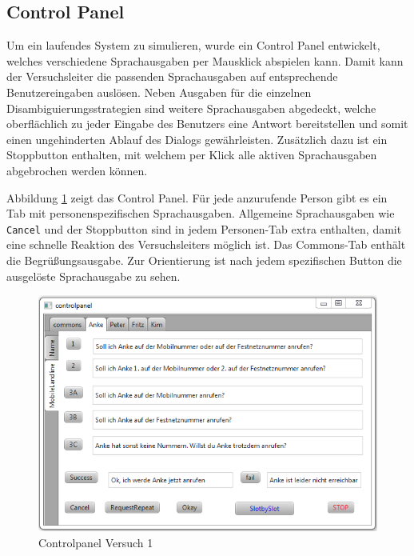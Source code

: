 \documentclass[12pt,a4paper]{scrartcl}
\begin{document}
\subsection{Control Panel}
\label{ControlPanel}
Um ein laufendes System zu simulieren, wurde ein Control Panel entwickelt, welches verschiedene Sprachausgaben per Mausklick abspielen kann. Damit kann der Versuchsleiter die passenden Sprachausgaben auf entsprechende Benutzereingaben auslösen. Neben Ausgaben für die einzelnen Disambiguierungsstrategien sind weitere Sprachausgaben abgedeckt, welche oberflächlich zu jeder Eingabe des Benutzers eine Antwort bereitstellen und somit einen ungehinderten Ablauf des Dialogs gewährleisten. Zusätzlich dazu ist ein Stoppbutton enthalten, mit welchem per Klick alle aktiven Sprachausgaben abgebrochen werden können. 

Abbildung \ref{cp1} zeigt das Control Panel. Für jede anzurufende Person gibt es ein Tab mit personenspezifischen Sprachausgaben. Allgemeine Sprachausgaben wie \texttt{Cancel} und der Stoppbutton sind in jedem Personen-Tab extra enthalten, damit eine schnelle Reaktion des Versuchsleiters möglich ist. Das Commons-Tab enthält die Begrüßungsausgabe. Zur Orientierung ist nach jedem spezifischen Button die ausgelöste Sprachausgabe zu sehen. 
\begin{figure}[htbp]
\includegraphics[width=13cm]{controlpanel.png}
\caption{Controlpanel Versuch 1}
\label{cp1}
\end{figure}
\end{document}
